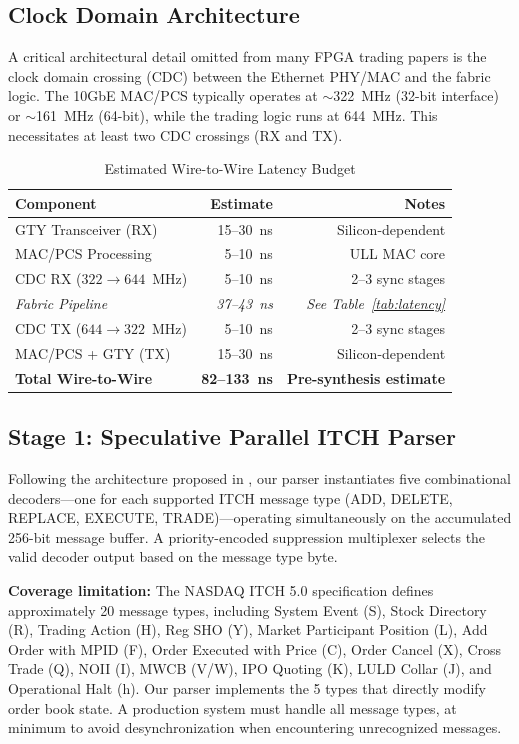 \documentclass[conference,10pt]{IEEEtran}
\begin{document}
\subsection{Clock Domain Architecture}

A critical architectural detail omitted from many FPGA trading papers is the clock domain crossing (CDC) between the Ethernet PHY/MAC and the fabric logic. The 10GbE MAC/PCS typically operates at $\sim$322~MHz (32-bit interface) or $\sim$161~MHz (64-bit), while the trading logic runs at 644~MHz. This necessitates at least two CDC crossings (RX and TX).

\begin{table}[h]
\centering
\caption{Estimated Wire-to-Wire Latency Budget}
\label{tab:latency_budget}
\begin{tabular}{@{}lrr@{}}
\toprule
Component & Estimate & Notes \\
\midrule
GTY Transceiver (RX) & 15--30~ns & Silicon-dependent \\
MAC/PCS Processing & 5--10~ns & ULL MAC core \\
CDC RX ($322 \to 644$~MHz) & 5--10~ns & 2--3 sync stages \\
\textit{Fabric Pipeline} & \textit{37--43~ns} & \textit{See Table~\ref{tab:latency}} \\
CDC TX ($644 \to 322$~MHz) & 5--10~ns & 2--3 sync stages \\
MAC/PCS + GTY (TX) & 15--30~ns & Silicon-dependent \\
\midrule
\textbf{Total Wire-to-Wire} & \textbf{82--133~ns} & \textbf{Pre-synthesis estimate} \\
\bottomrule
\end{tabular}
\end{table}

\subsection{Stage 1: Speculative Parallel ITCH Parser}

Following the architecture proposed in \cite{techrxiv2025}, our parser instantiates five combinational decoders---one for each supported ITCH message type (ADD, DELETE, REPLACE, EXECUTE, TRADE)---operating simultaneously on the accumulated 256-bit message buffer. A priority-encoded suppression multiplexer selects the valid decoder output based on the message type byte.

\textbf{Coverage limitation:} The NASDAQ ITCH 5.0 specification defines approximately 20 message types, including System Event (S), Stock Directory (R), Trading Action (H), Reg SHO (Y), Market Participant Position (L), Add Order with MPID (F), Order Executed with Price (C), Order Cancel (X), Cross Trade (Q), NOII (I), MWCB (V/W), IPO Quoting (K), LULD Collar (J), and Operational Halt (h). Our parser implements the 5 types that directly modify order book state. A production system must handle all message types, at minimum to avoid desynchronization when encountering unrecognized messages.
\end{document}
